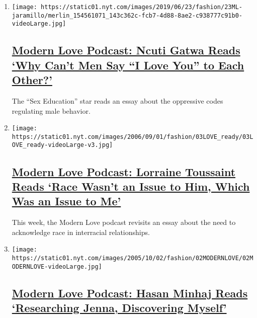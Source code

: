 \begin{enumerate}
\def\labelenumi{\arabic{enumi}.}
\item
  \texttt{[image: https://static01.nyt.com/images/2019/06/23/fashion/23ML-jaramillo/merlin\_154561071\_143c362c-fcb7-4d88-8ae2-c938777c91b0-videoLarge.jpg]}

  \hypertarget{modern-love-podcast-ncuti-gatwa-reads-why-cant-men-say-i-love-you-to-each-other}{%
  \subsection{\texorpdfstring{\href{/2020/06/17/style/modern-love-podcast-ncuti-gatwa.html}{Modern
  Love Podcast: Ncuti Gatwa Reads `Why Can't Men Say ``I Love You'' to
  Each
  Other?'}}{Modern Love Podcast: Ncuti Gatwa Reads `Why Can't Men Say ``I Love You'' to Each Other?'}}\label{modern-love-podcast-ncuti-gatwa-reads-why-cant-men-say-i-love-you-to-each-other}}

  The ``Sex Education'' star reads an essay about the oppressive codes
  regulating male behavior.
\item
  \texttt{[image: https://static01.nyt.com/images/2006/09/01/fashion/03LOVE\_ready/03LOVE\_ready-videoLarge-v3.jpg]}

  \hypertarget{modern-love-podcast-lorraine-toussaint-reads-race-wasnt-an-issue-to-him-which-was-an-issue-to-me}{%
  \subsection{\texorpdfstring{\href{/2020/06/10/style/modern-love-podcast-lorraine-toussant-updated-poscript.html}{Modern
  Love Podcast: Lorraine Toussaint Reads `Race Wasn't an Issue to Him,
  Which Was an Issue to
  Me'}}{Modern Love Podcast: Lorraine Toussaint Reads `Race Wasn't an Issue to Him, Which Was an Issue to Me'}}\label{modern-love-podcast-lorraine-toussaint-reads-race-wasnt-an-issue-to-him-which-was-an-issue-to-me}}

  This week, the Modern Love podcast revisits an essay about the need to
  acknowledge race in interracial relationships.
\item
  \texttt{[image: https://static01.nyt.com/images/2005/10/02/fashion/02MODERNLOVE/02MODERNLOVE-videoLarge.jpg]}

  \hypertarget{modern-love-podcast-hasan-minhaj-reads-researching-jenna-discovering-myself}{%
  \subsection{\texorpdfstring{\href{/2020/06/03/style/modern-love-podcast-hasan-minhaj.html}{Modern
  Love Podcast: Hasan Minhaj Reads `Researching Jenna, Discovering
  Myself'}}{Modern Love Podcast: Hasan Minhaj Reads `Researching Jenna, Discovering Myself'}}\label{modern-love-podcast-hasan-minhaj-reads-researching-jenna-discovering-myself}}


\end{enumerate}
